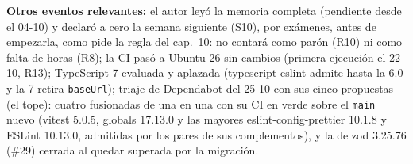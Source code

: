 \documentclass[11pt,a4paper]{article}
\begin{document}
\textbf{Otros eventos relevantes:} el autor leyó la memoria completa (pendiente desde el 04-10) y declaró a cero la semana siguiente (S10), por exámenes, antes de empezarla, como pide la regla del cap.~10: no contará como parón (R10) ni como falta de horas (R8); la CI pasó a Ubuntu 26 sin cambios (primera ejecución el 22-10, R13); TypeScript 7 evaluada y aplazada (typescript-eslint admite hasta la 6.0 y la 7 retira \texttt{baseUrl}); triaje de Dependabot del 25-10 con sus cinco propuestas (el tope): cuatro fusionadas de una en una con su CI en verde sobre el \texttt{main} nuevo (vitest 5.0.5, globals 17.13.0 y las mayores eslint-config-prettier 10.1.8 y ESLint 10.13.0, admitidas por los pares de sus complementos), y la de zod 3.25.76 (\#29) cerrada al quedar superada por la migración.
\end{document}
